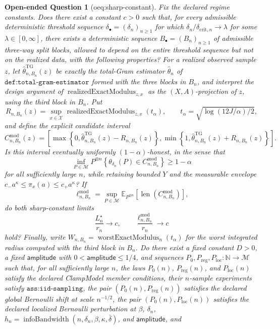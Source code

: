 \documentclass{article}
\newtheorem{openendedquestion}{Open-ended Question}
\begin{document}
\begin{openendedquestion}[oeq:sharp-constant]\label{oeq:sharp-constant}
Fix the declared regime constants.  Does there exist a constant \(c>0\) such that, for every admissible deterministic threshold sequence \(\delta_{\bullet}=(\delta_n)_{n\geq1}\) for which \(\delta_n/\delta_{\mathrm{crit},n}\to\lambda\) for some \(\lambda\in[0,\infty]\), there exists a deterministic sequence \(B_{\bullet}=(B_n)_{n\geq1}\) of admissible three-way split blocks, allowed to depend on the entire threshold sequence but not on the realized data, with the following properties?  For a realized observed sample \(z\), let \(\widehat\theta^{\mathrm{TG}}_{n,B_n}(z)\) be exactly the total-Gram estimator \(\widehat\theta_n\) of \(\texttt{def:total-gram-estimator}\) formed with the three blocks in \(B_n\), and interpret the design argument of \(\operatorname{realizedExactModulus}_{z,x}\) as the \((X,A)\)-projection of \(z\), using the third block in \(B_n\).  Put
\[
 R_{n,B_n}(z)=\sup_{x\in\mathcal X}\operatorname{realizedExactModulus}_{z,x}(t_\alpha),
 \qquad
 t_\alpha=\sqrt{\log(12J/\alpha)/2},
\]
and define the explicit candidate interval
\[
 C^{\mathrm{mod}}_{n,B_n}(z)=
 \left[
 \max\left\{0,\widehat\theta^{\mathrm{TG}}_{n,B_n}(z)-R_{n,B_n}(z)\right\},
 \min\left\{1,\widehat\theta^{\mathrm{TG}}_{n,B_n}(z)+R_{n,B_n}(z)\right\}
 \right].
\]
Is this interval eventually uniformly \((1-\alpha)\)-honest, in the sense that
\[
 \inf_{P\in\mathcal M}P^{\otimes n}
 \left\{\theta_{\delta_n}(P)\in C^{\mathrm{mod}}_{n,B_n}\right\}
 \geq1-\alpha
\]
for all sufficiently large \(n\), while retaining bounded \(Y\) and the measurable envelope \(c_-a^\kappa\leq\pi_x(a)\leq c_+a^\kappa\)?  If
\[
 \ell^{\mathrm{mod}}_{n,B_n}
 =\sup_{P\in\mathcal M}\mathbb E_{P^{\otimes n}}
 \left[\operatorname{len}\!\left(C^{\mathrm{mod}}_{n,B_n}\right)\right],
\]
do both sharp-constant limits
\[
 \frac{L_n^\star}{r_n}\longrightarrow c,
 \qquad
 \frac{\ell^{\mathrm{mod}}_{n,B_n}}{r_n}\longrightarrow c
\]
hold?  Finally, write \(W_{n,B_n}=\operatorname{worstExactModulus}_n(t_\alpha)\) for the worst integrated radius computed with the third block in \(B_n\).  Do there exist a fixed constant \(D>0\), a fixed \(\mathsf{amplitude}\) with \(0<\mathsf{amplitude}\leq1/4\), and sequences \(P_0,P_{\mathrm{reg}},P_{\mathrm{loc}}:\mathbb N\to\mathcal M\) such that, for all sufficiently large \(n\), the laws \(P_0(n)\), \(P_{\mathrm{reg}}(n)\), and \(P_{\mathrm{loc}}(n)\) satisfy the declared ClampModel member conditions, their \(n\)-sample experiments satisfy \(\texttt{ass:iid-sampling}\), the pair \((P_0(n),P_{\mathrm{reg}}(n))\) satisfies the declared global Bernoulli shift at scale \(n^{-1/2}\), the pair \((P_0(n),P_{\mathrm{loc}}(n))\) satisfies the declared localized Bernoulli perturbation at \(\beta\), \(\delta_n\), \(h_n=\operatorname{infoBandwidth}(n,\delta_n,\beta,\kappa,\bar\delta)\), and \(\mathsf{amplitude}\), and

\end{openendedquestion}
\end{document}
